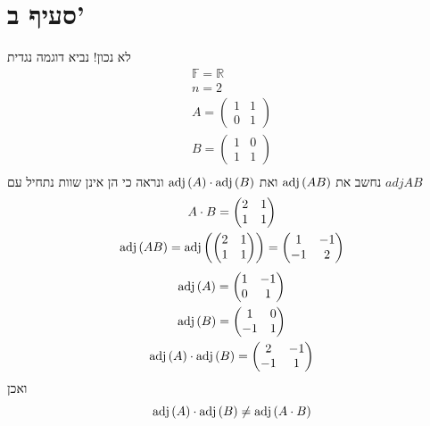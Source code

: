 \documentclass[12pt, titlepage]{article}
\begin{document}
\section*{סעיף ב'}
לא נכון! נביא דוגמה נגדית
\begin{gather*}
    \mathbb{F}=\mathbb{R}\\
    n=2\\
A = \begin{pmatrix}
    1 & 1 \\ 0 & 1
\end{pmatrix} \\
B = \begin{pmatrix}
    1 & 0 \\ 1 & 1
\end{pmatrix}\\
\end{gather*}
נחשב את $\mathrm{adj}\left(AB\right)$ ואת $\mathrm{adj}\left(A\right)\cdot\mathrm{adj}\left(B\right)$ ונראה כי הן אינן שוות
נתחיל עם $adj{AB}$
\begin{gather*}
    A\cdot B = \begin{pmatrix}
        2 & 1 \\ 1 & 1
    \end{pmatrix}  \\
    \mathrm{adj}\left(AB\right) = \mathrm{adj}\left(\begin{pmatrix}2 & 1 \\ 1 & 1\end{pmatrix}\right) = \begin{pmatrix}
        1 & -1 \\ -1 & 2
    \end{pmatrix}   
\end{gather*}
\begin{gather*}
    \mathrm{adj}\left(A\right) = \begin{pmatrix}
        1 & -1 \\ 0 & 1
    \end{pmatrix}  \\
    \mathrm{adj}\left(B\right) = \begin{pmatrix}
        1 & 0 \\ -1 & 1
    \end{pmatrix} \\
    \mathrm{adj}\left(A\right)\cdot\mathrm{adj}\left(B\right) = \begin{pmatrix}
        2 & -1 \\ -1 & 1
    \end{pmatrix}
\end{gather*}
ואכן
\[
    \mathrm{adj}\left(A\right)\cdot\mathrm{adj}\left(B\right) \neq \mathrm{adj}\left(A\cdot B\right)
\]
\end{document}
